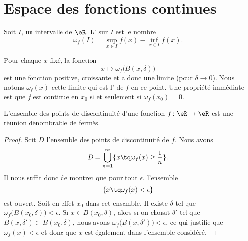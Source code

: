 \section{Espace des fonctions continues}

\begin{definition}
    Soit \( I\), un intervalle de \( \eR\). L' sur \( I\) est le nombre
    \begin{equation}
        \omega_f(I)=\sup_{x\in I}f(x)-\inf_{x\in I}f(x).
    \end{equation}
\end{definition}
    Pour chaque \( x\) fixé, la fonction
    \begin{equation}
        x\mapsto \omega_f\big( B(x,\delta) \big)
    \end{equation}
    est une fonction positive, croissante et a donc une limite (pour \( \delta\to 0\)). Nous notons \( \omega_f(x)\) cette limite qui est l' de \( f\) en ce point. Une propriété immédiate est que \( f\) est continue en \( x_0\) si et seulement si \( \omega_f(x_0)=0\).

    \begin{lemma}       \label{LemuaPbtQ}
    L'ensemble des points de discontinuité d'une fonction \( f\colon \eR\to \eR\) est une réunion dénombrable de fermés.
\end{lemma}

\begin{proof}
    Soit \( D\) l'ensemble des points de discontinuité de \( f\). Nous avons
    \begin{equation}
        D=\bigcup_{n=1}^{\infty}\{ x\tq \omega_f(x)\geq \frac{1}{ n } \}.
    \end{equation}
    Il nous suffit donc de montrer que pour tout \( \epsilon\), l'ensemble
    \begin{equation}
        \{ x\tq \omega_f(x)<\epsilon \}
    \end{equation}
    est ouvert. Soit en effet \( x_0\) dans cet ensemble. Il existe \( \delta\) tel que \( \omega_f\big( B(x_0,\delta) \big)<\epsilon\). Si \( x\in B(x_0,\delta)\), alors si on choisit \( \delta'\) tel que \( B(x,\delta')\subset B(x_0,\delta)\), nous avons \( \omega_f\big( B(x,\delta') \big)<\epsilon\), ce qui justifie que \( \omega_f(x)<\epsilon\) et donc que \( x\) est également dans l'ensemble considéré.
\end{proof}

